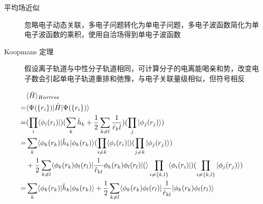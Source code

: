 \begin{description}
	\item[平均场近似] 忽略电子动态关联，多电子问题转化为单电子问题，多电子波函数简化为单电子波函数的乘积，使用自洽场得到单电子波函数

	\item[Koopmans 定理]假设离子轨道与中性分子轨道相同，可计算分子的电离能喝亲和势，改变电子数会引起单电子轨道重排和弛豫，与电子关联量级相似，但符号相反
\end{description} 
\begin{align*}
&\langle \hat{H} \rangle_{Hartree} \\
=& \langle \Psi(\{r_i\}) | \hat{H} | \Psi(\{r_i\}) \rangle\\
=&(\prod_i\langle \phi_i(r_i) |)(\sum_k\hat{h}_k+\frac{1}{2}\sum_{k\neq l}\frac{1}{\hat{r}_kl})(\prod_j| \phi_j(r_j) \rangle)\\
=&\sum_k\langle \phi_k(r_k) | \hat{h}_k | \phi_k(r_k) \rangle(\prod_{i\neq k}\langle \phi_i(r_i) |)(\prod_{j \neq k}| \phi_j(r_j) \rangle)\\
&+\frac{1}{2}\sum_{k \neq l}\langle \phi_k(r_k)\phi_l(r_l) | \frac{1}{\hat{r}_{kl}}\phi_k(r_k)\phi_l(r_l) | ( \rangle\prod_{i \neq \{k,l\}}\langle \phi_i(r_i) |)(\prod_{i \neq \{k,l\}}| \phi_j(r_j) \rangle)\\
=&\sum_k\langle \phi_k(r_k) | \hat{h}_k | \phi_k(r_k) \rangle+\frac{1}{2}\sum_{k \neq l}\langle \phi_k(r_k)\phi_l(r_l) | \frac{1}{\hat{r}_{kl}} | \phi_k(r_k)\phi_l(r_l) \rangle
\end{align*}

